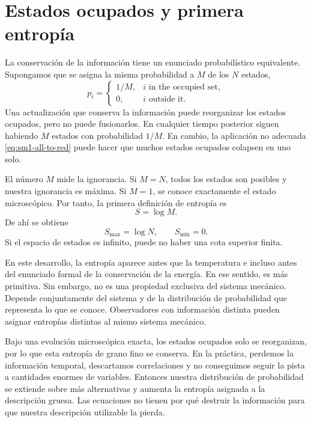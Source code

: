 \section{Estados ocupados y primera entropía}

La conservación de la información tiene un enunciado probabilístico equivalente. Supongamos que se asigna la misma probabilidad a \(M\) de los \(N\) estados,
\begin{equation}
 p_i=
 \begin{cases}
 1/M, & i\text{ in the occupied set},\\
 0, & i\text{ outside it}.
 \end{cases}
 \label{eq:sm1-uniform-occupied}
\end{equation}
Una actualización que conserva la información puede reorganizar los estados ocupados, pero no puede fusionarlos. En cualquier tiempo posterior siguen habiendo \(M\) estados con probabilidad \(1/M\). En cambio, la aplicación no adecuada \eqref{eq:sm1-all-to-red} puede hacer que muchos estados ocupados colapsen en uno solo.

El número \(M\) mide la ignorancia. Si \(M=N\), todos los estados son posibles y nuestra ignorancia es máxima. Si \(M=1\), se conoce exactamente el estado microscópico. Por tanto, la primera definición de entropía es
\begin{equation}
 S=\log M.
 \label{eq:sm1-entropy-logm}
\end{equation}
De ahí se obtiene
\begin{equation}
 S_{\max}=\log N,
 \qquad
 S_{\min}=0.
\end{equation}
Si el espacio de estados es infinito, puede no haber una cota superior finita.

En este desarrollo, la entropía aparece antes que la temperatura e incluso antes del enunciado formal de la conservación de la energía. En ese sentido, es más primitiva. Sin embargo, no es una propiedad exclusiva del sistema mecánico. Depende conjuntamente del sistema y de la distribución de probabilidad que representa lo que se conoce. Observadores con información distinta pueden asignar entropías distintas al mismo sistema mecánico.

Bajo una evolución microscópica exacta, los estados ocupados solo se reorganizan, por lo que esta entropía de grano fino se conserva. En la práctica, perdemos la información temporal, descartamos correlaciones y no conseguimos seguir la pista a cantidades enormes de variables. Entonces nuestra distribución de probabilidad se extiende sobre más alternativas y aumenta la entropía asignada a la descripción gruesa. Las ecuaciones no tienen por qué destruir la información para que nuestra descripción utilizable la pierda.

